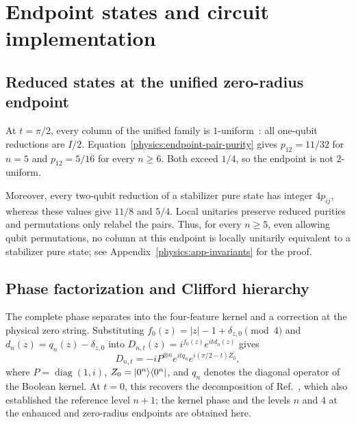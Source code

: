\section{Endpoint states and circuit implementation}
\label{physics:section}

\subsection{Reduced states at the unified zero-radius endpoint}
\label{physics:endpoints}

At $t=\pi/2$, every column of the unified family is $1$-uniform~\cite{Scott2004}: all one-qubit reductions are $I/2$. Equation~\eqref{physics:endpoint-pair-purity} gives $p_{12}=11/32$ for $n=5$ and $p_{12}=5/16$ for every $n\ge6$. Both exceed $1/4$, so the endpoint is not $2$-uniform.

Moreover, every two-qubit reduction of a stabilizer pure state has integer $4p_{ij}$, whereas these values give $11/8$ and $5/4$. Local unitaries preserve reduced purities and permutations only relabel the pairs. Thus, for every $n\ge5$, even allowing qubit permutations, no column at this endpoint is locally unitarily equivalent to a stabilizer pure state; see Appendix~\ref{physics:app-invariants} for the proof.

\subsection{Phase factorization and Clifford hierarchy}
\label{physics:implementation}

The complete phase separates into the four-feature kernel and a correction at the physical zero string. Substituting $f_0(z)=|z|-1+\delta_{z,0}\pmod4$ and $d_n(z)=q_n(z)-\delta_{z,0}$ into $D_{n,t}(z)=i^{f_0(z)}e^{itd_n(z)}$ gives
\begin{equation}
 D_{n,t}=-iP^{\otimes n}e^{itq_n}e^{i(\pi/2-t)Z_0},
 \label{physics:factorization}
\end{equation}
where $P=\operatorname{diag}(1,i)$, $Z_0=\lvert 0^n\rangle\langle 0^n\rvert$, and $q_n$ denotes the diagonal operator of the Boolean kernel. At $t=0$, this recovers the decomposition of Ref.~\cite{PauwelsGisin2026}, which also established the reference level $n+1$; the kernel phase and the levels $n$ and $4$ at the enhanced and zero-radius endpoints are obtained here.

